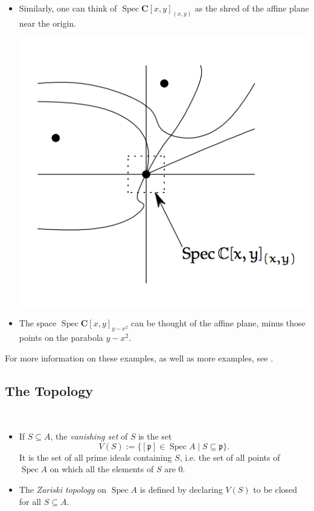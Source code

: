 \documentclass[11pt,openany]{book} %
\newcommand{\C}{\mathbf{C}}
\newcommand{\spc}{\operatorname{Spec}}
\begin{document}
\begin{example}
\begin{itemize}
    \item Similarly, one can think of $\spc \C[x,y]_{(x,y)}$ as the shred of the affine plane near the origin.
    \begin{center}
    \includegraphics[scale=0.6]{localshred}
    \end{center}
    
    \item The space $\spc \C[x,y]_{y-x^2}$ can be thought of the affine plane, minus those points on the parabola $y - x^2$.
\end{itemize}
For more information on these examples, as well as more examples, see \cite{vakil}.
\end{example}
\pagebreak


\subsection{The Topology}

\begin{definition}\
\begin{itemize}
	\item If $S \subseteq A$, the \emph{vanishing set} of $S$ is the set
	\[
		V(S) := \{[\mathfrak{p}] \in \spc A \mid S \subseteq \mathfrak{p}\}.
	\]
	It is the set of all prime ideals containing $S$, i.e. the set of all points of $\spc A$ on which all the elements of $S$ are $0$.

	\item The \emph{Zariski topology} on $\spc A$ is defined by declaring $V(S)$ to be closed for all $S \subseteq A$.
\end{itemize}
\end{definition}
\end{document}
